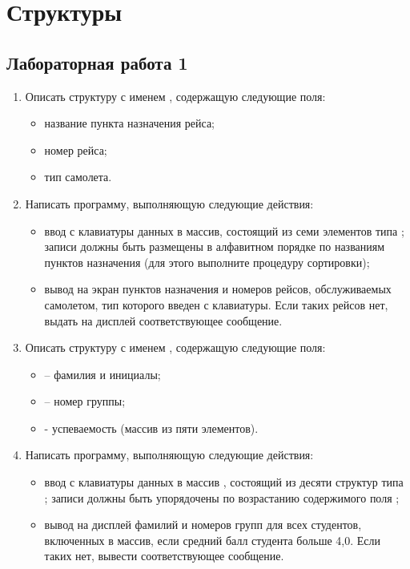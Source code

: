 \chapter{Структуры}
\section{Лабораторная работа 1}
\begin{enumerate}[leftmargin=*]
    \item Описать структуру с именем , содержащую следующие поля:
        \begin{itemize}
            \item название пункта назначения рейса;
            \item номер рейса;
            \item тип самолета.
        \end{itemize}
    \item Написать программу, выполняющую следующие действия:
        \begin{itemize}
            \item ввод с клавиатуры данных в массив, состоящий из семи элементов типа ; записи должны быть размещены в алфавитном порядке по названиям пунктов назначения (для этого выполните процедуру сортировки);
            \item вывод на экран пунктов назначения и номеров рейсов, обслуживаемых самолетом, тип которого введен с клавиатуры. Если таких рейсов нет, выдать на дисплей соответствующее сообщение.
        \end{itemize}
    \item Описать структуру с именем , содержащую следующие поля:
        \begin{itemize}
            \item {} – фамилия и инициалы;
            \item {} – номер группы;
            \item {} - успеваемость (массив из пяти элементов).
        \end{itemize}
    \item Написать программу, выполняющую следующие действия:
        \begin{itemize}
            \item ввод с клавиатуры данных в массив , состоящий из десяти структур типа ; записи должны быть упорядочены по возрастанию содержимого поля ;
            \item вывод на дисплей фамилий и номеров групп для всех студентов, включенных в массив, если средний балл студента больше 4,0. Если таких нет, вывести соответствующее сообщение.
        \end{itemize}
\end{enumerate}
